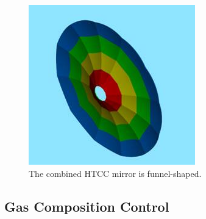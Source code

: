 \begin{figure}[ht]
    \centering
    \includegraphics[width=1.0\linewidth,trim={0 0cm 0 0},clip]{images/Colored_Mirror.jpg}
    \caption{The combined HTCC mirror is funnel-shaped.}
    \label{fig:Colored_Mirror}
\end{figure}

\subsection{Gas Composition Control}

